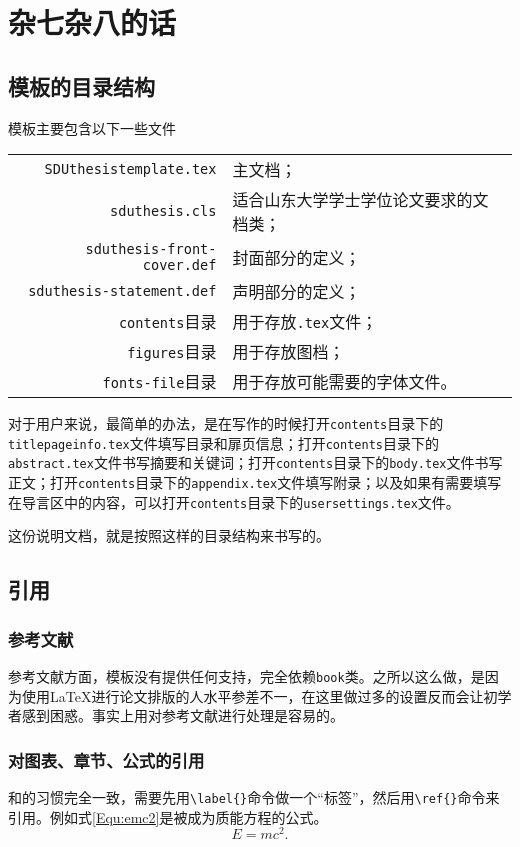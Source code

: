\chapter{杂七杂八的话}
\section{模板的目录结构}
模板主要包含以下一些文件
\begin{center}
\begin{tabular}
{rl}
\toprule
\texttt{SDUthesistemplate.tex}& 主文档；\\
\texttt{sduthesis.cls}& 适合山东大学学士学位论文要求的文档类；\\
\texttt{sduthesis-front-cover.def}& 封面部分的定义；\\
\texttt{sduthesis-statement.def}& 声明部分的定义；\\
\texttt{contents}目录& 用于存放\texttt{.tex}文件；\\
\texttt{figures}目录& 用于存放图档；\\
\texttt{fonts-file}目录& 用于存放可能需要的字体文件。\\
\bottomrule
\end{tabular}
\end{center}

对于用户来说，最简单的办法，是在写作的时候打开\texttt{contents}目录下的\texttt{titlepageinfo.tex}文件填写目录和扉页信息；打开\texttt{contents}目录下的\texttt{abstract.tex}文件书写摘要和关键词；打开\texttt{contents}目录下的\texttt{body.tex}文件书写正文；打开\texttt{contents}目录下的\texttt{appendix.tex}文件填写附录；以及如果有需要填写在导言区中的内容，可以打开\texttt{contents}目录下的\texttt{usersettings.tex}文件。

这份说明文档，就是按照这样的目录结构来书写的。
\section{引用}
\subsection{参考文献}
参考文献方面，模板没有提供任何支持，完全依赖\texttt{book}类。之所以这么做，是因为使用\LaTeX{}进行论文排版的人水平参差不一，在这里做过多的设置反而会让初学者感到困惑。事实上用\BibTeX{}对参考文献进行处理是容易的。
\subsection{对图表、章节、公式的引用}
和\LaTeXe{}的习惯完全一致，需要先用\verb|\label{}|命令做一个“标签”，然后用\verb|\ref{}|命令来引用。例如式\ref{Equ:emc2}是被成为质能方程的公式。
\begin{equation}
E = m c^2.
\label{Equ:emc2}
\end{equation}
